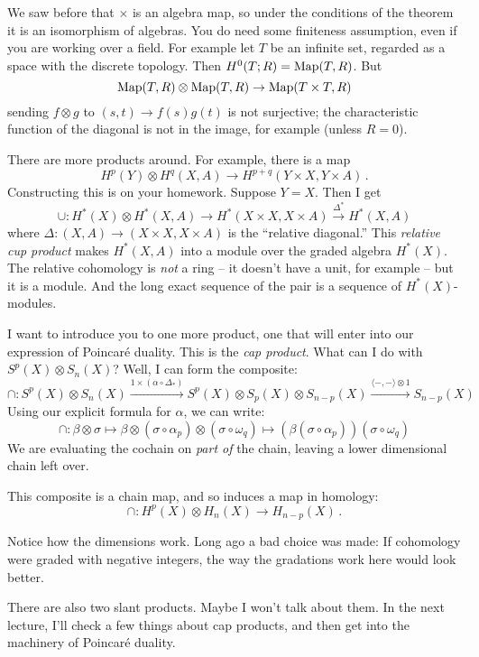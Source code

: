 We saw before that $\times$ is an algebra map, so under the conditions of the
theorem it is an isomorphism of algebras. You do need some finiteness 
assumption, even if you are working over a field. For example let $T$ be an
infinite set, regarded as a space with the discrete topology. Then 
$H^0(T;R)=\operatorname{Map}(T,R)$. But
\[
\operatorname{Map}(T,R)\otimes\operatorname{Map}(T,R)\to\operatorname{Map}(T\times T,R)
\]
sending $f\otimes g$ to $(s,t)\to f(s)g(t)$ is not surjective; the 
characteristic function of the diagonal is not in the image, for example
(unless $R=0$).

There are more products around. For example, there is a map 
\[
H^p(Y)\otimes H^q(X,A)\to H^{p+q}(Y\times X,Y\times A)\,.
\]
Constructing this is on your homework. Suppose $Y=X$. 
Then I get 
\[
\cup: H^\ast(X)\otimes H^\ast(X,A)\to H^\ast(X\times X,X\times A)\xrightarrow{\Delta^\ast} H^\ast(X,A)
\]
where $\Delta:(X,A)\to (X\times X,X\times A)$ is the ``relative diagonal.'' 
This {\em relative cup product} makes $ H^\ast(X,A)$ into a module over the graded algebra $ H^\ast(X)$. The relative cohomology is \emph{not} a ring -- it doesn't have a unit, for example -- but it is a module. And the long exact sequence of the pair is a sequence of $ H^\ast(X)$-modules. 

I want to introduce you to one more product, one that will enter into our
expression of Poincar\'{e} duality. This is the {\em cap product}.
What can I do with $S^p(X)\otimes S_n(X)$? Well, I can form the composite:
\begin{equation*}
\cap:S^p(X)\otimes S_n(X)\xrightarrow{1\times (\alpha\circ \Delta_\ast)} S^p(X)\otimes S_p(X)\otimes S_{n-p}(X)\xrightarrow{\langle -,-\rangle\otimes 1}S_{n-p}(X)
\end{equation*}
Using our explicit formula for $\alpha$, we can write:
\begin{equation*}
\cap:\beta\otimes\sigma\mapsto\beta\otimes(\sigma\circ\alpha_p)\otimes(\sigma\circ\omega_q)\mapsto\left(\beta(\sigma\circ\alpha_p)\right) (\sigma\circ\omega_q)
\end{equation*}
We are evaluating the cochain on {\em part of} the chain, leaving a lower 
dimensional chain left over.

This composite is a chain map, and so induces a map in homology:
\[
\cap:H^p(X)\otimes H_n(X)\to H_{n-p}(X)\,.
\]

Notice how the dimensions work. Long ago a bad choice was made: If cohomology
were graded with negative integers, the way the gradations work here would
look better.

There are also two slant products. Maybe I won't talk about them. In the next lecture, I'll check a few things about cap products, and then get into the machinery of Poincar\'{e} duality.
